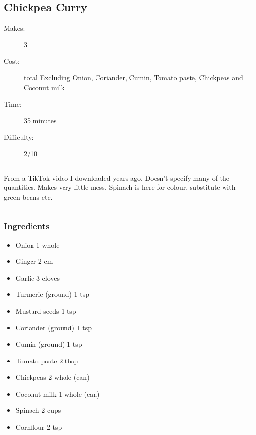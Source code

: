 \documentclass[]{article}
\begin{document}
\subsection*{\center\huge Chickpea Curry}
\begin{description}
\item[Makes:] 3 
\item[Cost:]  total Excluding Onion, Coriander, Cumin, Tomato paste, Chickpeas and Coconut milk
\item[Time:] 35 minutes
\item[Difficulty:] 2/10
\end{description}
\vspace{0.2cm}\hrule\vspace{0.5cm}
\begin{adjustwidth}{0.5 cm}{0.5 cm}

From a TikTok video I downloaded years ago. Doesn't specify many of the quantities. Makes very little mess. Spinach is here for colour, substitute with green beans etc. \hfill{}\color{black}

\end{adjustwidth}
\vspace{0.5cm}\hrule
\subsubsection*{\Large Ingredients}
\begin{multicols}{2}
\begin{itemize}
 \item Onion \hfill 1 whole
 \item Ginger \hfill 2 cm
 \item Garlic \hfill 3 cloves
 \item Turmeric (ground) \hfill 1 tsp
 \item Mustard seeds \hfill 1 tsp
 \item Coriander (ground) \hfill 1 tsp
 \item Cumin (ground) \hfill 1 tsp
 \item Tomato paste \hfill 2 tbsp
 \item Chickpeas \hfill 2 whole (can)
 \item Coconut milk \hfill 1 whole (can)
 \item Spinach \hfill 2 cups
 \item Cornflour \hfill 2 tsp
\end{itemize}
\end{multicols}
\end{document}
